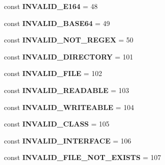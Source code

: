 \begin{DoxyCompactItemize}
const {\bfseries I\+N\+V\+A\+L\+I\+D\+\_\+\+E164} = 48
\item 
\mbox{\label{class_assert_1_1_assertion_acded573aba65717a1b1fcc36eb96fe3f}} 
const {\bfseries I\+N\+V\+A\+L\+I\+D\+\_\+\+B\+A\+S\+E64} = 49
\item 
\mbox{\label{class_assert_1_1_assertion_a0f5856a9047f72632dd4bb37f1769b1f}} 
const {\bfseries I\+N\+V\+A\+L\+I\+D\+\_\+\+N\+O\+T\+\_\+\+R\+E\+G\+EX} = 50
\item 
\mbox{\label{class_assert_1_1_assertion_aa5fd450fe66b81c0ef849cc013105da2}} 
const {\bfseries I\+N\+V\+A\+L\+I\+D\+\_\+\+D\+I\+R\+E\+C\+T\+O\+RY} = 101
\item 
\mbox{\label{class_assert_1_1_assertion_a899087a2c4465f75687783dedaf9c90b}} 
const {\bfseries I\+N\+V\+A\+L\+I\+D\+\_\+\+F\+I\+LE} = 102
\item 
\mbox{\label{class_assert_1_1_assertion_aaeafaf4b33ca9532cbc9906440b3727a}} 
const {\bfseries I\+N\+V\+A\+L\+I\+D\+\_\+\+R\+E\+A\+D\+A\+B\+LE} = 103
\item 
\mbox{\label{class_assert_1_1_assertion_a0fea165e39b918927faa090767ccfdba}} 
const {\bfseries I\+N\+V\+A\+L\+I\+D\+\_\+\+W\+R\+I\+T\+E\+A\+B\+LE} = 104
\item 
\mbox{\label{class_assert_1_1_assertion_ae0dbed2dccf533d4f265bef4ada26ef4}} 
const {\bfseries I\+N\+V\+A\+L\+I\+D\+\_\+\+C\+L\+A\+SS} = 105
\item 
\mbox{\label{class_assert_1_1_assertion_a9f4dd293abed8b0817d4f1c037ccc5fd}} 
const {\bfseries I\+N\+V\+A\+L\+I\+D\+\_\+\+I\+N\+T\+E\+R\+F\+A\+CE} = 106
\item 
\mbox{\label{class_assert_1_1_assertion_aed48d075e0cd13f32bd9c15b71e01987}} 
const {\bfseries I\+N\+V\+A\+L\+I\+D\+\_\+\+F\+I\+L\+E\+\_\+\+N\+O\+T\+\_\+\+E\+X\+I\+S\+TS} = 107
\item 
\mbox{\label{class_assert_1_1_assertion_aff4ec10027f8f9394c3f9b395588618f}} 

\end{DoxyCompactItemize}
